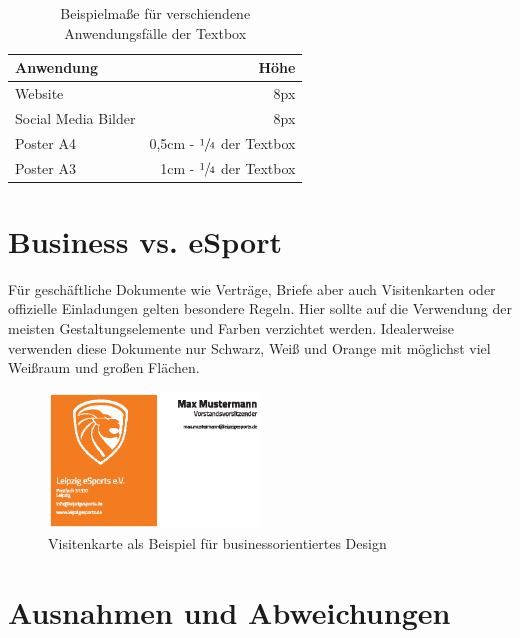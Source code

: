 \documentclass{article}
\begin{document}
\begin{table}[H]
\begin{center}
\begin{tabular}{ | l | r | }
\hline
  \textbf{Anwendung} & \textbf{Höhe} \\
\hline
  Website & 8px \\
\hline
  Social Media Bilder & 8px \\
\hline
  Poster A4 & 0,5cm - $\sfrac{1}{4}$ der Textbox \\
\hline
  Poster A3 & 1cm - $\sfrac{1}{4}$ der Textbox \\
\hline
\end{tabular}
\end{center}
\caption{Beispielmaße für verschiendene Anwendungsfälle der Textbox}
\end{table}


\cleardoublepage
\section{Business vs. eSport}

Für geschäftliche Dokumente wie Verträge, Briefe aber auch Visitenkarten oder offizielle Einladungen gelten besondere Regeln. Hier sollte auf die Verwendung der meisten Gestaltungselemente und Farben verzichtet werden. Idealerweise verwenden diese Dokumente nur Schwarz, Weiß und Orange mit möglichst viel Weißraum und großen Flächen.

\begin{figure}[H]
\begin{center}
\includegraphics[width=0.5\textwidth]{Docs/Visitenkarte.eps}
\end{center}
\caption{Visitenkarte als Beispiel für businessorientiertes Design}
\end{figure}

\cleardoublepage
\section{Ausnahmen und Abweichungen}
\end{document}
